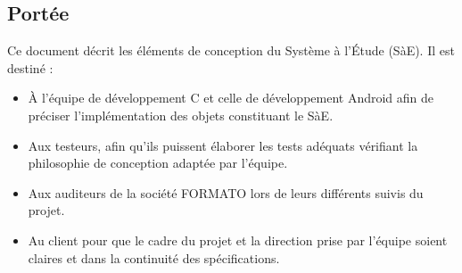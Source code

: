 \subsection{Portée}

Ce document décrit les éléments de conception du Système à l'Étude (SàE). Il est destiné :

\begin{itemize}
    \item À l'équipe de développement C et celle de développement Android afin de préciser l'implémentation des objets constituant le SàE.
    \item Aux testeurs, afin qu'ils puissent élaborer les tests adéquats vérifiant la philosophie de conception adaptée par l'équipe.
    \item Aux auditeurs de la société FORMATO lors de leurs différents suivis du projet.
    \item Au client pour que le cadre du projet et la direction prise par l'équipe soient claires et dans la continuité des spécifications.
\end{itemize}

